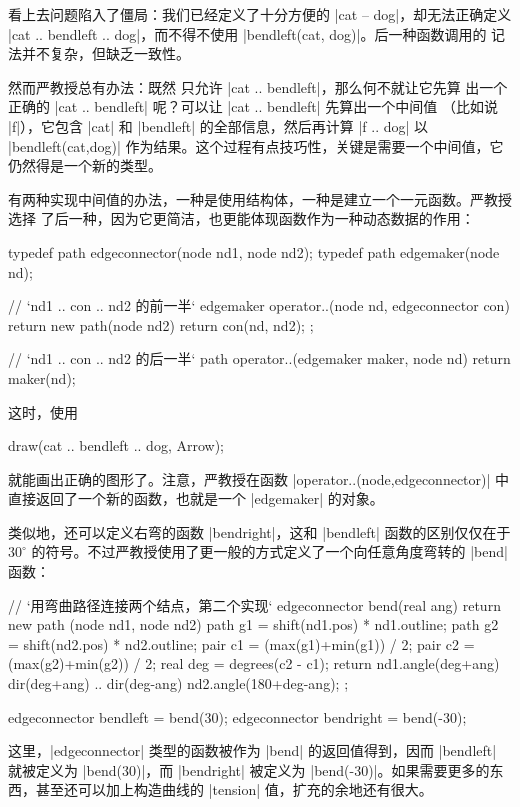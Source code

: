 看上去问题陷入了僵局：我们已经定义了十分方便的 |cat -- dog|，却无法正确定义
|cat .. bendleft .. dog|，而不得不使用 |bendleft(cat, dog)|。后一种函数调用的
记法并不复杂，但缺乏一致性。

然而严教授总有办法：既然 \Asy{} 只允许 |cat .. bendleft|，那么何不就让它先算
出一个正确的 |cat .. bendleft| 呢？可以让 |cat .. bendleft| 先算出一个中间值
（比如说 |f|），它包含 |cat| 和 |bendleft| 的全部信息，然后再计算 |f .. dog|
以 |bendleft(cat,dog)| 作为结果。这个过程有点技巧性，关键是需要一个中间值，它
仍然得是一个新的类型。

有两种实现中间值的办法，一种是使用结构体，一种是建立一个一元函数。严教授选择
了后一种，因为它更简洁，也更能体现函数作为一种动态数据的作用：
\begin{asycode}
typedef path edgeconnector(node nd1, node nd2);
typedef path edgemaker(node nd);

// `\color{comment}nd1 .. con .. nd2 的前一半`
edgemaker operator..(node nd, edgeconnector con)
{
    return new path(node nd2) {
        return con(nd, nd2);
    };
}

// `\color{comment}nd1 .. con .. nd2 的后一半`
path operator..(edgemaker maker, node nd)
{
    return maker(nd);
}
\end{asycode}
这时，使用
\begin{asycode}
draw(cat .. bendleft .. dog, Arrow);
\end{asycode}
就能画出正确的图形了。注意，严教授在函数 |operator..(node,edgeconnector)| 中
直接返回了一个新的函数，也就是一个 |edgemaker| 的对象。

类似地，还可以定义右弯的函数 |bendright|，这和 |bendleft| 函数的区别仅仅在于
$30^\circ$ 的符号。不过严教授使用了更一般的方式定义了一个向任意角度弯转的
|bend| 函数：
\begin{asycode}
// `\color{comment}用弯曲路径连接两个结点，第二个实现`
edgeconnector bend(real ang)
{
    return new path (node nd1, node nd2) {
        path g1 = shift(nd1.pos) * nd1.outline;
        path g2 = shift(nd2.pos) * nd2.outline;
        pair c1 = (max(g1)+min(g1)) / 2;
        pair c2 = (max(g2)+min(g2)) / 2;
        real deg = degrees(c2 - c1);
        return nd1.angle(deg+ang) {dir(deg+ang)}
            .. {dir(deg-ang)} nd2.angle(180+deg-ang);
    };
}

edgeconnector bendleft = bend(30);
edgeconnector bendright = bend(-30);
\end{asycode}
这里，|edgeconnector| 类型的函数被作为 |bend| 的返回值得到，因而 |bendleft| 
就被定义为 |bend(30)|，而 |bendright| 被定义为 |bend(-30)|。如果需要更多的东
西，甚至还可以加上构造曲线的 |tension| 值，扩充的余地还有很大。

